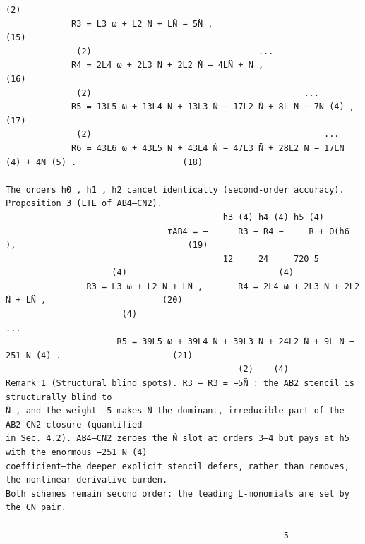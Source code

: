 \documentclass[letterpaper]{article}
\begin{document}
\begin{Verbatim}[fontsize=\fontsize{6.35}{7.15}\selectfont,breaklines=false]
               (2)
             R3 = L3 ω + L2 N + LṄ − 5N̈ ,                                                              (15)
              (2)                                 ...
             R4 = 2L4 ω + 2L3 N + 2L2 Ṅ − 4LN̈ + N ,                                                    (16)
              (2)                                          ...
             R5 = 13L5 ω + 13L4 N + 13L3 Ṅ − 17L2 N̈ + 8L N − 7N (4) ,                                  (17)
              (2)                                              ...
             R6 = 43L6 ω + 43L5 N + 43L4 Ṅ − 47L3 N̈ + 28L2 N − 17LN (4) + 4N (5) .                     (18)

The orders h0 , h1 , h2 cancel identically (second-order accuracy).
Proposition 3 (LTE of AB4–CN2).
                                           h3 (4) h4 (4) h5 (4)
                                τAB4 = −      R3 − R4 −     R + O(h6 ),                                  (19)
                                           12     24     720 5
                     (4)                              (4)
                R3 = L3 ω + L2 N + LṄ ,       R4 = 2L4 ω + 2L3 N + 2L2 Ṅ + LN̈ ,                       (20)
                       (4)                                          ...
                      R5 = 39L5 ω + 39L4 N + 39L3 Ṅ + 24L2 N̈ + 9L N − 251 N (4) .                      (21)
                                              (2)    (4)
Remark 1 (Structural blind spots). R3 − R3 = −5N̈ : the AB2 stencil is structurally blind to
N̈ , and the weight −5 makes N̈ the dominant, irreducible part of the AB2–CN2 closure (quantified
in Sec. 4.2). AB4–CN2 zeroes the N̈ slot at orders 3–4 but pays at h5 with the enormous −251 N (4)
coefficient—the deeper explicit stencil defers, rather than removes, the nonlinear-derivative burden.
Both schemes remain second order: the leading L-monomials are set by the CN pair.

                                                       5
\end{Verbatim}
\newpage
\end{document}
